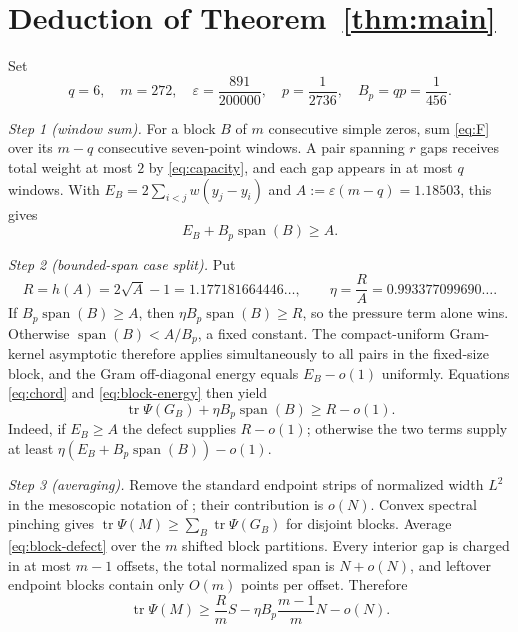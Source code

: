 \documentclass[11pt]{article}
\theoremstyle{remark}
\newcommand{\tr}{\operatorname{tr}}
\begin{document}
\section{Deduction of Theorem~\ref{thm:main}}

Set
\[
q=6,\quad m=272,\quad \varepsilon=\frac{891}{200000},\quad
p=\frac1{2736},\quad B_p=qp=\frac1{456}.
\]

\emph{Step 1 (window sum).}
For a block $B$ of $m$ consecutive simple zeros, sum \eqref{eq:F} over its
$m-q$ consecutive seven-point windows.  A pair spanning $r$ gaps receives
total weight at most $2$ by \eqref{eq:capacity}, and each gap appears in at
most $q$ windows.  With $E_B=2\sum_{i<j}w(y_j-y_i)$ and
$A:=\varepsilon(m-q)=1.18503$, this gives
\begin{equation}\label{eq:block-energy}
E_B+B_p\operatorname{span}(B)\ge A.
\end{equation}

\emph{Step 2 (bounded-span case split).}
Put
\[
R=h(A)=2\sqrt A-1=1.177181664446\ldots,
\qquad \eta=\frac RA=0.993377099690\ldots.
\]
If $B_p\operatorname{span}(B)\ge A$, then
$\eta B_p\operatorname{span}(B)\ge R$, so the pressure term alone wins.
Otherwise
$\operatorname{span}(B)<A/B_p$, a fixed constant.  The compact-uniform
Gram-kernel asymptotic therefore applies simultaneously to all pairs in the
fixed-size block, and the Gram off-diagonal energy equals $E_B-o(1)$
uniformly.  Equations \eqref{eq:chord} and \eqref{eq:block-energy} then yield
\begin{equation}\label{eq:block-defect}
\tr\Psi(G_B)+\eta B_p\operatorname{span}(B)\ge R-o(1).
\end{equation}
Indeed, if $E_B\ge A$ the defect supplies $R-o(1)$; otherwise the two terms
supply at least $\eta(E_B+B_p\operatorname{span}(B))-o(1)$.

\emph{Step 3 (averaging).}
Remove the standard endpoint strips of normalized width $L^2$ in the
mesoscopic notation of \cite{Ainta2026}; their contribution is $o(N)$.
Convex spectral pinching gives
$\tr\Psi(M)\ge\sum_B\tr\Psi(G_B)$ for disjoint blocks.  Average
\eqref{eq:block-defect} over the $m$ shifted block partitions.  Every
interior gap is charged in at most $m-1$ offsets, the total normalized span
is $N+o(N)$, and leftover endpoint blocks contain only $O(m)$ points per
offset.  Therefore
\begin{equation}\label{eq:average}
\tr\Psi(M)\ge
\frac RmS-\eta B_p\frac{m-1}{m}N-o(N).
\end{equation}
\end{document}
